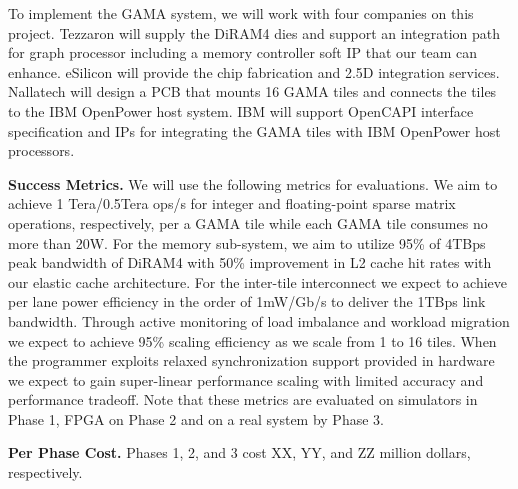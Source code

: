 

To implement the GAMA system, %
we will work with 
four companies on this project. 
Tezzaron will supply the DiRAM4 dies and support an integration path for graph processor including a memory controller soft IP that our team can enhance.
eSilicon will provide the chip fabrication and 2.5D integration services.
Nallatech will design a PCB that mounts 16 GAMA tiles and connects the tiles to the IBM OpenPower host system. %
IBM will support OpenCAPI interface specification and IPs for integrating the GAMA tiles with IBM OpenPower host processors. 

\vspace{3pt}
\noindent
\textbf{Success Metrics.} 
We will use the following metrics for evaluations.
We aim to achieve 1 Tera/0.5Tera ops/s for integer and floating-point sparse matrix operations, respectively, per a GAMA tile while each GAMA tile consumes no more than 20W.
For the memory sub-system, we aim to utilize 95\% of 4TBps peak bandwidth of DiRAM4 with 50\% improvement in L2 cache hit rates with our elastic cache architecture.
For the inter-tile interconnect we expect to achieve per lane power efficiency in the order of 1mW/Gb/s to deliver the 1TBps link bandwidth. %
Through active monitoring of load imbalance and workload migration we expect to achieve 95\% scaling efficiency as we scale from 1 to 16 tiles. 
When the programmer exploits relaxed synchronization support provided in hardware  we expect to gain super-linear performance scaling with limited accuracy and performance tradeoff.  
Note that these metrics are evaluated on simulators in Phase 1, FPGA on Phase 2 and on a real system by Phase 3.  


\vspace{3pt}
\noindent
\textbf{Per Phase Cost.} 
Phases 1, 2, and 3 cost XX, YY, and ZZ million dollars, respectively.


